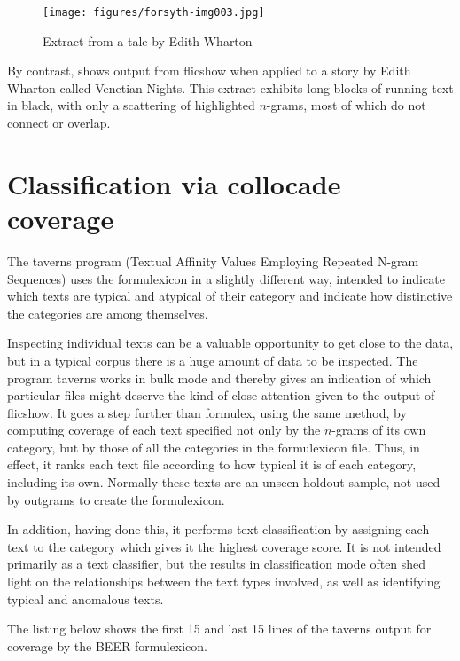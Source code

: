 \documentclass[output=paper]{langscibook}
\begin{document}
\begin{figure}[p]
\texttt{[image: figures/forsyth-img003.jpg]}
\caption{Extract from a tale by Edith Wharton}
\label{fig:forsyth:3}
\end{figure}

By contrast,  shows output from flicshow when applied to a story by Edith Wharton called Venetian Nights. This extract exhibits long blocks of running text in black, with only a scattering of highlighted $n$-grams, most of which do not connect or overlap.

\section{Classification via collocade coverage}\label{sec:forsyth:6}

The taverns program (Textual Affinity Values Employing Repeated N-gram Sequences) uses the formulexicon in a slightly different way, intended to indicate which texts are typical and atypical of their category and indicate how distinctive the categories are among themselves.

Inspecting individual texts can be a valuable opportunity to get close to the data, but in a typical corpus there is a huge amount of data to be inspected. The program taverns works in bulk mode and thereby gives an indication of which particular files might deserve the kind of close attention given to the output of flicshow. It goes a step further than formulex, using the same method, by computing coverage of each text specified not only by the $n$-grams of its own category, but by those of all the categories in the formulexicon file. Thus, in effect, it ranks each text file according to how typical it is of each category, including its own. Normally these texts are an unseen holdout sample, not used by outgrams to create the formulexicon.

In addition, having done this, it performs text classification by assigning each text to the category which gives it the highest coverage score. It is not intended primarily as a text classifier, but the results in classification mode often shed light on the relationships between the text types involved, as well as identifying typical and anomalous texts.

The listing below shows the first 15 and last 15 lines of the taverns output for coverage by the BEER formulexicon.\bigskip
\end{document}
